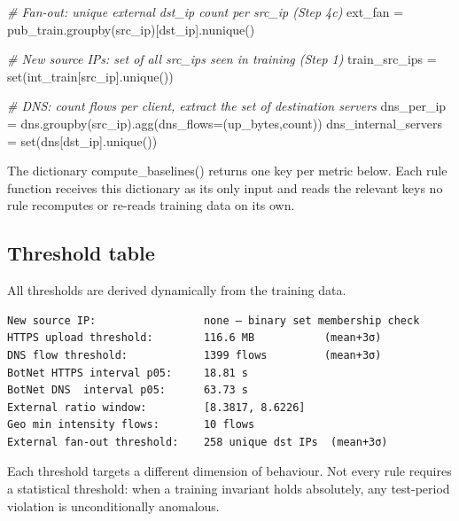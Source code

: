 \documentclass[
  11pt,
]{article}
\newenvironment{Shaded}{\vspace{4pt}}{\vspace{4pt}}
\newcommand{\BuiltInTok}[1]{\textcolor[rgb]{0.00,0.50,0.00}{#1}}
\newcommand{\CommentTok}[1]{\textcolor[rgb]{0.38,0.63,0.69}{\textit{#1}}}
\newcommand{\NormalTok}[1]{#1}
\newcommand{\OperatorTok}[1]{\textcolor[rgb]{0.40,0.40,0.40}{#1}}
\newcommand{\StringTok}[1]{\textcolor[rgb]{0.25,0.44,0.63}{#1}}
\begin{document}
\begin{Shaded}
\begin{Highlighting}[]
\CommentTok{\# Fan{-}out: unique external dst\_ip count per src\_ip (Step 4c)}
\NormalTok{  ext\_fan }\OperatorTok{=}\NormalTok{ pub\_train.groupby(}\StringTok{\textquotesingle{}src\_ip\textquotesingle{}}\NormalTok{)[}\StringTok{\textquotesingle{}dst\_ip\textquotesingle{}}\NormalTok{].nunique()}

\CommentTok{\# New source IPs: set of all src\_ips seen in training (Step 1)}
\NormalTok{  train\_src\_ips }\OperatorTok{=} \BuiltInTok{set}\NormalTok{(int\_train[}\StringTok{\textquotesingle{}src\_ip\textquotesingle{}}\NormalTok{].unique())}

\CommentTok{\# DNS: count flows per client, extract the set of destination servers}
\NormalTok{  dns\_per\_ip }\OperatorTok{=}\NormalTok{ dns.groupby(}\StringTok{\textquotesingle{}src\_ip\textquotesingle{}}\NormalTok{).agg(dns\_flows}\OperatorTok{=}\NormalTok{(}\StringTok{\textquotesingle{}up\_bytes\textquotesingle{}}\NormalTok{,}\StringTok{\textquotesingle{}count\textquotesingle{}}\NormalTok{))}
\NormalTok{  dns\_internal\_servers }\OperatorTok{=} \BuiltInTok{set}\NormalTok{(dns[}\StringTok{\textquotesingle{}dst\_ip\textquotesingle{}}\NormalTok{].unique())}
\end{Highlighting}
\end{Shaded}

The dictionary compute\_baselines() returns one key per metric below.
Each rule function receives this dictionary as its only input and reads
the relevant keys no rule recomputes or re-reads training data on its
own.

\hypertarget{threshold-table}{%
\subsection{Threshold table}\label{threshold-table}}

All thresholds are derived dynamically from the training data. 

\begin{verbatim}
New source IP:                 none — binary set membership check
HTTPS upload threshold:        116.6 MB           (mean+3σ)
DNS flow threshold:            1399 flows         (mean+3σ)
BotNet HTTPS interval p05:     18.81 s
BotNet DNS  interval p05:      63.73 s
External ratio window:         [8.3817, 8.6226]
Geo min intensity flows:       10 flows
External fan-out threshold:    258 unique dst IPs  (mean+3σ)
\end{verbatim}

Each threshold targets a different dimension of behaviour. Not every rule requires a statistical threshold: when a training invariant holds absolutely, any test-period violation is unconditionally anomalous.
\end{document}

